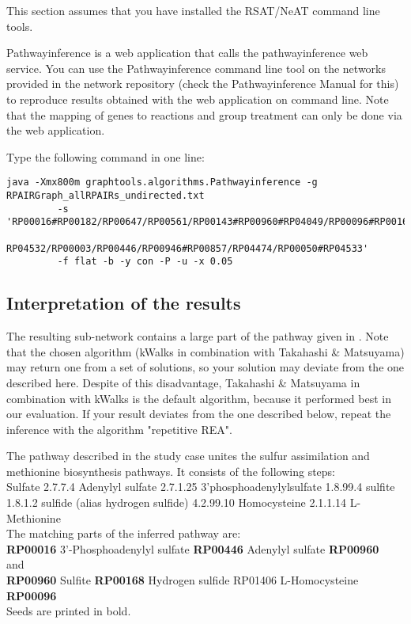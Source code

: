 This section assumes that you have installed the RSAT/NeAT command line tools.

Pathwayinference is a web application that calls the pathwayinference web service.
You can use the Pathwayinference command line tool on the networks provided in the
network repository (check the Pathwayinference Manual for this) to reproduce
results obtained with the web application on command line.
Note that the mapping of genes to reactions and group treatment can only be done via the web application.

Type the following command in one line:
{\color{Blue} \begin{footnotesize}
		\begin{verbatim}
java -Xmx800m graphtools.algorithms.Pathwayinference -g RPAIRGraph_allRPAIRs_undirected.txt
	     -s 'RP00016#RP00182/RP00647/RP00561/RP00143#RP00960#RP04049/RP00096#RP00168#
	     RP04532/RP00003/RP00446/RP00946#RP00857/RP04474/RP00050#RP04533'
	     -f flat -b -y con -P -u -x 0.05
	\end{verbatim} \end{footnotesize}
	}

\subsection{Interpretation of the results}

The resulting sub-network contains a large part of the pathway given in \cite{vanHelden01}.
Note that the chosen algorithm (kWalks in combination with Takahashi \& Matsuyama) may return one
from a set of solutions, so your solution may deviate from the one described here.
Despite of this disadvantage, Takahashi \& Matsuyama in combination with kWalks
is the default algorithm, because it performed best in our evaluation.
If your result deviates from the one described below,
repeat the inference with the algorithm "repetitive REA".

The pathway described in the study case unites the sulfur assimilation and methionine biosynthesis pathways. It consists of the following steps: \\
Sulfate 2.7.7.4 Adenylyl sulfate 2.7.1.25 3'phosphoadenylylsulfate 1.8.99.4 sulfite 1.8.1.2 sulfide (alias hydrogen sulfide) 4.2.99.10 Homocysteine 2.1.1.14 L-Methionine\\

The matching parts of the inferred pathway are:\\

\textbf{RP00016} 3'-Phosphoadenylyl sulfate \textbf{RP00446} Adenylyl sulfate \textbf{RP00960}\\
and\\
\textbf{RP00960} Sulfite \textbf{RP00168} Hydrogen sulfide RP01406 L-Homocysteine \textbf{RP00096}\\
Seeds are printed in bold.

